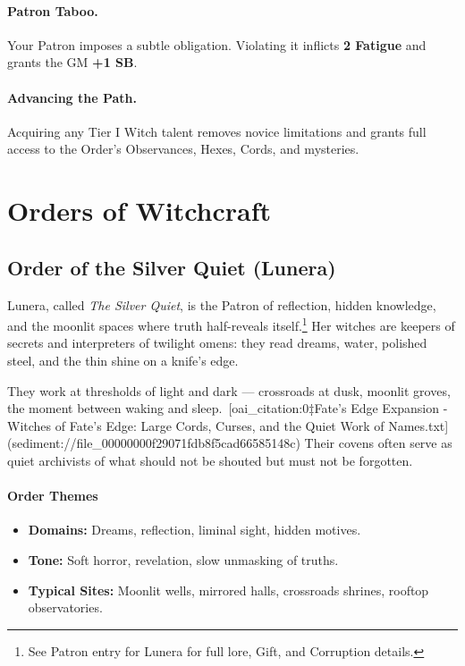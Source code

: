 \documentclass[11pt]{book}
\begin{document}
\begin{tcolorbox}[colback=mistgray!10,colframe=shadowpurple,
title={\textbf{Crossing the Threshold} --- Witch Initiation Talent (6 XP)}]
\paragraph{Patron Taboo.}
Your Patron imposes a subtle obligation. Violating it inflicts \textbf{2 Fatigue}
and grants the GM \textbf{+1 SB}.

\paragraph{Advancing the Path.}
Acquiring any Tier I Witch talent removes novice limitations
and grants full access to the Order's Observances, Hexes, Cords, and mysteries.

\end{tcolorbox}

\section{Orders of Witchcraft}

\subsection{Order of the Silver Quiet (Lunera)}

Lunera, called \emph{The Silver Quiet}, is the Patron of reflection, hidden knowledge, and the moonlit spaces where truth half-reveals itself.\footnote{See Patron entry for Lunera for full lore, Gift, and Corruption details.} Her witches are keepers of secrets and interpreters of twilight omens: they read dreams, water, polished steel, and the thin shine on a knife's edge.

They work at thresholds of light and dark --- crossroads at dusk, moonlit groves, the moment between waking and sleep.\ [oai_citation:0‡Fate's Edge Expansion - Witches of Fate's Edge: Large Cords, Curses, and the Quiet Work of Names.txt](sediment://file_00000000f29071fdb8f5cad66585148c){} Their covens often serve as quiet archivists of what should not be shouted but must not be forgotten.

\paragraph{Order Themes}
\begin{itemize}[leftmargin=*]
  \item \textbf{Domains:} Dreams, reflection, liminal sight, hidden motives.
  \item \textbf{Tone:} Soft horror, revelation, slow unmasking of truths.
  \item \textbf{Typical Sites:} Moonlit wells, mirrored halls, crossroads shrines, rooftop observatories.
\end{itemize}
\end{document}
